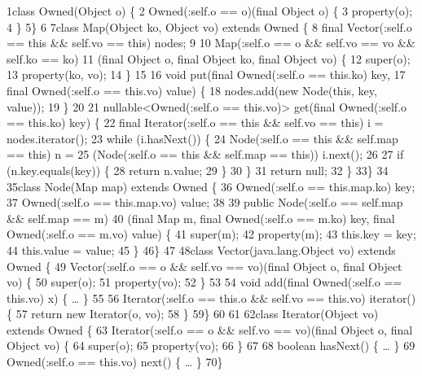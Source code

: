 \begin{tightcode}
\quad\num{1}class Owned(Object o) \{
\quad\num{2}  Owned(:self.o == o)(final Object o) \{
\quad\num{3}    property(o);
\quad\num{4}  \}
\quad\num{5}\}
\quad\num{6}
\quad\num{7}class Map(Object ko, Object vo) extends Owned \{
\quad\num{8}  final Vector(:self.o == this && self.vo == this) nodes;
\quad\num{9}
\quad\num{10}  Map(:self.o == o && self.vo == vo && self.ko == ko)
\quad\num{11}     (final Object o, final Object ko, final Object vo) \{
\quad\num{12}    super(o);
\quad\num{13}    property(ko, vo);
\quad\num{14}  \}
\quad\num{15}
\quad\num{16}  void put(final Owned(:self.o == this.ko) key,
\quad\num{17}           final Owned(:self.o == this.vo) value) \{
\quad\num{18}    nodes.add(new Node(this, key, value));
\quad\num{19}  \}
\quad\num{20}
\quad\num{21}  nullable<Owned(:self.o == this.vo)> get(final Owned(:self.o == this.ko) key) \{
\quad\num{22}    final Iterator(:self.o == this && self.vo == this) i = nodes.iterator();
\quad\num{23}    while (i.hasNext()) \{
\quad\num{24}      Node(:self.o == this && self.map == this) n =
\quad\num{25}        (Node(:self.o == this && self.map == this)) i.next();
\quad\num{26}      
\quad\num{27}      if (n.key.equals(key)) \{
\quad\num{28}        return n.value;
\quad\num{29}      \}
\quad\num{30}    \}
\quad\num{31}    return null;
\quad\num{32}  \}
\quad\num{33}\}
\quad\num{34}
\quad\num{35}class Node(Map map) extends Owned \{
\quad\num{36}  Owned(:self.o == this.map.ko) key;
\quad\num{37}  Owned(:self.o == this.map.vo) value;
\quad\num{38}
\quad\num{39}  public Node(:self.o == self.map && self.map == m)
\quad\num{40}    (final Map m, final Owned(:self.o == m.ko) key, final Owned(:self.o == m.vo) value) \{
\quad\num{41}    super(m);
\quad\num{42}    property(m);
\quad\num{43}    this.key = key;
\quad\num{44}    this.value = value;
\quad\num{45}  \}
\quad\num{46}\}
\quad\num{47}
\quad\num{48}class Vector(java.lang.Object vo) extends Owned \{
\quad\num{49}  Vector(:self.o == o && self.vo == vo)(final Object o, final Object vo) \{
\quad\num{50}    super(o);
\quad\num{51}    property(vo);
\quad\num{52}  \}
\quad\num{53}
\quad\num{54}  void add(final Owned(:self.o == this.vo) x) \{ \ldots{} \}
\quad\num{55}
\quad\num{56}  Iterator(:self.o == this.o && self.vo == this.vo) iterator() \{
\quad\num{57}    return new Iterator(o, vo);
\quad\num{58}  \}
\quad\num{59}\}
\quad\num{60}
\quad\num{61}
\quad\num{62}class Iterator(Object vo) extends Owned \{
\quad\num{63}  Iterator(:self.o == o && self.vo == vo)(final Object o, final Object vo) \{
\quad\num{64}    super(o);
\quad\num{65}    property(vo);
\quad\num{66}  \}
\quad\num{67}
\quad\num{68}  boolean hasNext() \{ \ldots{} \}
\quad\num{69}  Owned(:self.o == this.vo) next() \{ \ldots{} \}
\quad\num{70}\}
\end{tightcode}
